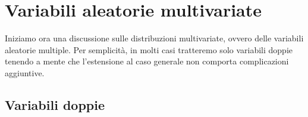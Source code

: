 \chapter{Variabili aleatorie multivariate}
Iniziamo ora una discussione sulle distribuzioni multivariate, ovvero delle variabili aleatorie
multiple. Per semplicità, in molti casi tratteremo solo variabili doppie tenendo a mente che
l'estensione al caso generale non comporta complicazioni aggiuntive.

\section{Variabili doppie}